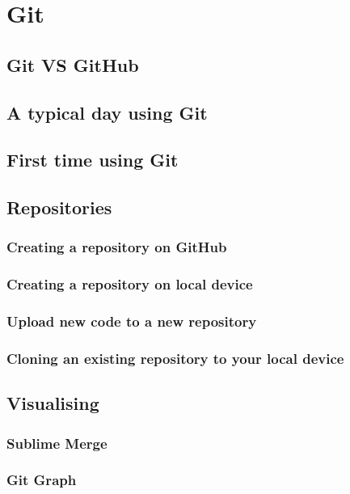 \chapter{Git}

\section{Git VS GitHub}

\section{A typical day using Git}

\section{First time using Git}

\section{Repositories}

\subsection{Creating a repository on GitHub}

\subsection{Creating a repository on local device}

\subsection{Upload new code to a new repository}

\subsection{Cloning an existing repository to your local device}

\section{Visualising}

\subsection*{Sublime Merge}

\subsection*{Git Graph}

